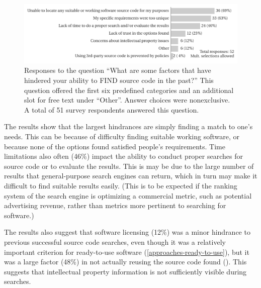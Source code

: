 \documentclass{casicswhitepaper}
\begin{document}
\begin{figure}[htb]
  \vspace*{-2ex}
  \centering
  \includegraphics[width=6.5in]{files/plots/factors-that-hindered-finding-src.pdf}
  \vspace*{-4ex}
  \caption{Responses to the question ``What are some factors that have hindered your ability to FIND source code in the past?''  This question offered the first six predefined categories and an additional slot for free text under ``Other''.  Answer choices were nonexclusive.  A total of 51 survey respondents answered this question.}
  \label{factors-that-hindered}
\end{figure}

The results show that the largest hindrances are simply finding a match to one's needs.  This can be because of difficulty finding suitable working software, or because none of the options found satisfied people's requirements.  Time limitations also often (46\%) impact the ability to conduct proper searches for source code or to evaluate the results.  This is may be due to the large number of results that general-purpose search engines can return, which in turn may make it difficult to find suitable results easily.  (This is to be expected if the ranking system of the search engine is optimizing a commercial metric, such as potential advertising revenue, rather than metrics more pertinent to searching for software.)

The results also suggest that software licensing (12\%) was a minor hindrance to previous successful source code searches, even though it was a relatively important criterion for ready-to-use software (\ref{approaches-ready-to-use}), but it was a large factor (48\%) in not actually reusing the source code found (). This suggests that intellectual property information is not sufficiently visible during searches.

%
\end{document}
